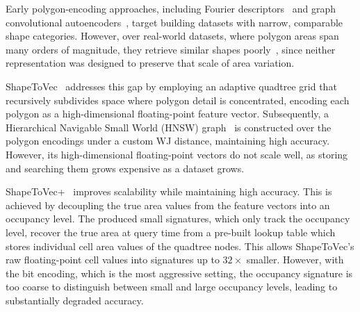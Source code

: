 \documentclass[conference]{IEEEtran}
\newcommand{\rs}[1]{\textcolor{green!55!black}{[RS: #1]}}
\newcommand{\ba}[1]{\textcolor{orange}{[BA: #1]}}
\begin{document}

Early polygon-encoding approaches, including Fourier
descriptors~\cite{ai13fourier} and graph convolutional
autoencoders~\cite{yan21gcae}, target building datasets with narrow, comparable
shape categories. However, over real-world datasets, where polygon areas span many orders of
magnitude, they retrieve similar shapes poorly~\cite{shape2vec}, since neither
representation was designed to preserve that scale of area variation.

ShapeToVec~\cite{shape2vec} addresses this gap by employing an adaptive quadtree grid that recursively subdivides
space where polygon detail is concentrated, encoding each polygon as a
high-dimensional floating-point feature vector. Subsequently, a Hierarchical Navigable Small World (HNSW)
graph~\cite{hnsw20} is constructed over the polygon encodings under a custom WJ distance, maintaining high accuracy. However, its high-dimensional floating-point vectors do not scale well, as storing and searching them grows expensive as a dataset grows.

ShapeToVec+~\cite{shapetovecplus26} improves scalability while maintaining high accuracy. This is achieved by decoupling the true area values from the feature vectors into an occupancy level. The produced small signatures, which only track the occupancy level, recover the true area at query time from a pre-built lookup table which stores individual cell area values of the quadtree nodes. This allows ShapeToVec's raw floating-point cell values
into signatures up to $32\times$ smaller. However, with the bit encoding, which is the most aggressive
setting, the occupancy signature is too coarse to distinguish between small and large occupancy levels, leading to substantially degraded accuracy. 
\end{document}
